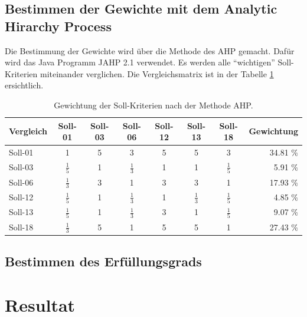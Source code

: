   \subsection{Bestimmen der Gewichte mit dem Analytic Hirarchy Process}
  
  Die Bestimmung der Gewichte wird über die Methode des \ac{AHP} gemacht. Dafür
  wird das Java Programm JAHP 2.1 verwendet. Es werden alle ``wichtigen'' 
  Soll-Kriterien miteinander verglichen. Die Vergleichsmatrix ist in der Tabelle
  \ref{tab:gewichtungDerSollKriterien} ersichtlich.
  
  \begin{table}[!h]
    \sffamily 
    \begin{center}
      \begin{tabular}{l|cccccc|r}
        \toprule
        Vergleich & Soll-01 & Soll-03 & Soll-06 & Soll-12 & Soll-13 & Soll-18
        & Gewichtung\\
        \midrule
        Soll-01 & 1 & 5 & 3 & 5 & 5 & 3 & 34.81 \%\\
        Soll-03 & $\frac{1}{5}$ & 1 & $\frac{1}{3}$ & 1 & 1 & $\frac{1}{5}$ &
        5.91 \%\\
        Soll-06 & $\frac{1}{3}$ & 3 & 1 & 3 & 3 & 1 & 17.93 \%\\
        Soll-12 & $\frac{1}{5}$ & 1 & $\frac{1}{3}$ & 1 & $\frac{1}{3}$ &
        $\frac{1}{5}$ & 4.85 \% \\
        Soll-13 & $\frac{1}{5}$ & 1 & $\frac{1}{3}$ & 3 & 1 & $\frac{1}{5}$ &
        9.07 \%\\ Soll-18 & $\frac{1}{3}$ & 5 & 1 & 5 & 5 & 1 & 27.43 \%\\
        \bottomrule
      \end{tabular}
      \caption{Gewichtung der Soll-Kriterien nach der Methode AHP.}
      \label{tab:gewichtungDerSollKriterien}
    \end{center}
  \end{table}
  
  \subsection{Bestimmen des Erfüllungsgrads}
  
  \section{Resultat}
